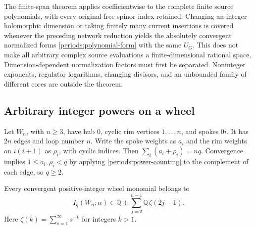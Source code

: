 The finite-span theorem applies coefficientwise to the complete finite
source polynomials, with every original free spinor index retained.
Changing an integer holomorphic dimension or taking finitely many current
insertions is covered whenever the preceding network reduction yields
the absolutely convergent normalized forms
\eqref{periods:polynomial-form} with the same $U_G$.  This does not make
all arbitrary complex source evaluations a finite-dimensional rational
space.  Dimension-dependent normalization factors must first be
separated.  Noninteger exponents, regulator logarithms, changing divisors,
and an unbounded family of different cores are outside the theorem.

\subsection{Arbitrary integer powers on a wheel}
\label{periods:wheel-upper}

Let $W_n$, with $n\ge3$, have hub $0$, cyclic rim vertices
$1,\ldots,n$, and spokes $0i$.  It has $2n$ edges and loop number $n$.
Write the spoke weights as $a_i$ and the rim weights on $i(i+1)$ as
$\rho_i$, with cyclic indices.  Then
$\sum_i(a_i+\rho_i)=nq$.  Convergence implies
$1\le a_i,\rho_i<q$ by applying
\eqref{periods:power-counting} to the complement of each edge, so $q\ge2$.

\begin{proposition}
\label{periods:wheel-upper-proposition}
Every convergent positive-integer wheel monomial belongs to
\begin{equation}
 I_q(W_n;\alpha)\in
 \mathbb Q+\sum_{j=2}^{n-1}\mathbb Q\,\zeta(2j-1).
 \label{periods:wheel-upper-space}
\end{equation}
Here $\zeta(k)=\sum_{s=1}^{\infty}s^{-k}$ for integers $k>1$.
\end{proposition}

